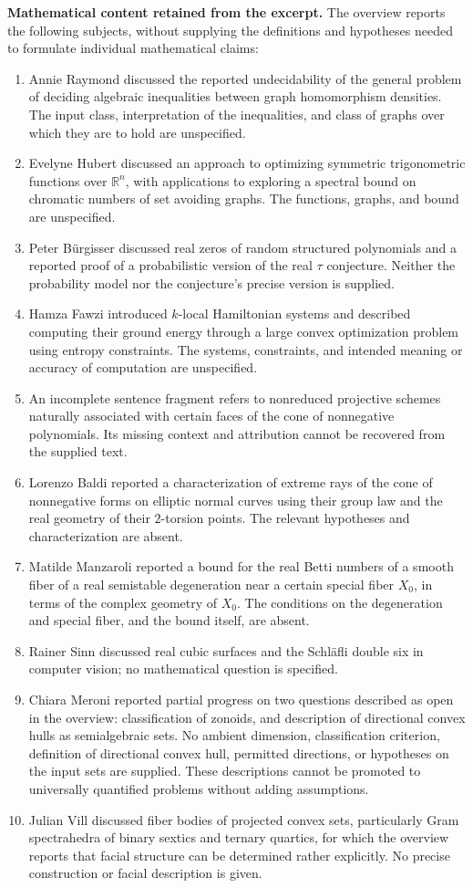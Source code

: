 \documentclass[11pt]{article}
\newcommand{\R}{\mathbb{R}}
\begin{document}
\textbf{Mathematical content retained from the excerpt.} The overview reports the following subjects, without supplying the definitions and hypotheses needed to formulate individual mathematical claims:
\begin{enumerate}
\item Annie Raymond discussed the reported undecidability of the general problem of deciding algebraic inequalities between graph homomorphism densities. The input class, interpretation of the inequalities, and class of graphs over which they are to hold are unspecified.
\item Evelyne Hubert discussed an approach to optimizing symmetric trigonometric functions over \(\R^n\), with applications to exploring a spectral bound on chromatic numbers of set avoiding graphs. The functions, graphs, and bound are unspecified.
\item Peter B\"urgisser discussed real zeros of random structured polynomials and a reported proof of a probabilistic version of the real \(\tau\) conjecture. Neither the probability model nor the conjecture's precise version is supplied.
\item Hamza Fawzi introduced \(k\)-local Hamiltonian systems and described computing their ground energy through a large convex optimization problem using entropy constraints. The systems, constraints, and intended meaning or accuracy of computation are unspecified.
\item An incomplete sentence fragment refers to nonreduced projective schemes naturally associated with certain faces of the cone of nonnegative polynomials. Its missing context and attribution cannot be recovered from the supplied text.
\item Lorenzo Baldi reported a characterization of extreme rays of the cone of nonnegative forms on elliptic normal curves using their group law and the real geometry of their \(2\)-torsion points. The relevant hypotheses and characterization are absent.
\item Matilde Manzaroli reported a bound for the real Betti numbers of a smooth fiber of a real semistable degeneration near a certain special fiber \(X_0\), in terms of the complex geometry of \(X_0\). The conditions on the degeneration and special fiber, and the bound itself, are absent.
\item Rainer Sinn discussed real cubic surfaces and the Schl\"afli double six in computer vision; no mathematical question is specified.
\item Chiara Meroni reported partial progress on two questions described as open in the overview: classification of zonoids, and description of directional convex hulls as semialgebraic sets. No ambient dimension, classification criterion, definition of directional convex hull, permitted directions, or hypotheses on the input sets are supplied. These descriptions cannot be promoted to universally quantified problems without adding assumptions.
\item Julian Vill discussed fiber bodies of projected convex sets, particularly Gram spectrahedra of binary sextics and ternary quartics, for which the overview reports that facial structure can be determined rather explicitly. No precise construction or facial description is given.
\end{enumerate}
\end{document}
